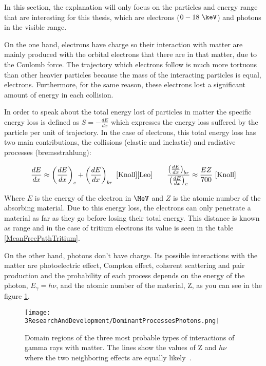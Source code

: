 In this section, the explanation will only focus on the particles and energy range that are interesting for this thesis, which are electrons ($0-18~\keV$) and photons in the visible range.

On the one hand, electrons have charge so their interaction with matter are mainly produced with the orbital electrons that there are in that matter, due to the Coulomb force. The trajectory which electrons follow is much more tortuous than other heavier particles because the mass of the interacting particles is equal, electrons. Furthermore, for the same reason, these electrons lost a significant amount of energy in each collision.

In order to speak about the total energy lost of particles in matter the specific energy loss is defined as $S=-\frac{dE}{dx}$ which expresses the energy loss suffered by the particle per unit of trajectory. In the case of electrons, this total energy loss has two main contributions, the collisions (elastic and inelastic) and radiative processes (bremsstrahlung):

$$\frac{dE}{dx} \approx \left(\frac{dE}{dx}\right)_{c} + \left(\frac{dE}{dx}\right)_{br} ~\cite{Knoll} \cite{Leo} \qquad  \frac{\left(\frac{dE}{dx}\right)_{br}}{\left(\frac{dE}{dx}\right)_{c}} \approx \frac{EZ}{700} ~\cite{Knoll}$$

Where $E$ is the energy of the electron in $\MeV$ and $Z$ is the atomic number of the absorbing material. Due to this energy loss, the electrons can only penetrate a material as far as they go before losing their total energy. This distance is known as range and in the case of tritium electrons its value is seen in the table \ref{MeanFreePathTritium}.

On the other hand, photons don't have charge. Its possible interactions with the matter are photoelectric effect, Compton effect, coherent scattering and pair production and the probability of each process depends on the energy of the photon, $E_\gamma = h\nu$, and the atomic number of the material, Z, as you can see in the figure \ref{ProcessesPhotons}.

\begin{figure}[htbp]
\centering
\texttt{[image: 3ResearchAndDevelopment/DominantProcessesPhotons.png]}
\caption{Domain regions of the three most probable types of interactions of gamma rays with matter. The lines show the values of Z and $h\nu$ where the two neighboring effects are equally likely~\cite{Knoll}.\label{ProcessesPhotons}~\cite{Knoll}}
\end{figure}

